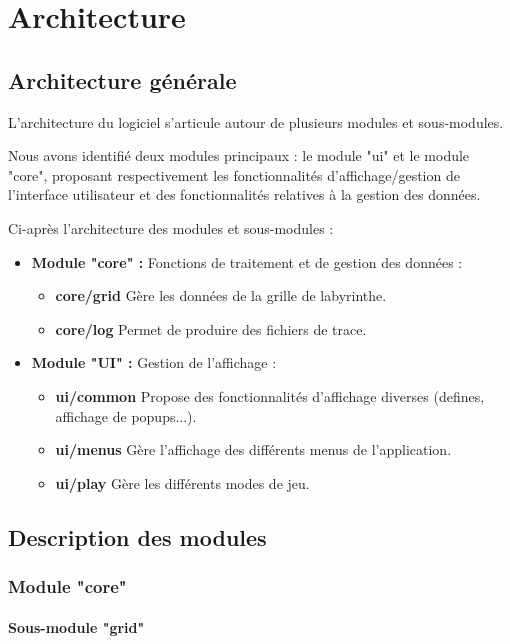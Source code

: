 \documentclass{book}
\begin{document}
\chapter{Architecture}

\section{Architecture générale}

L'architecture du logiciel s'articule autour de plusieurs modules et sous-modules.

Nous avons identifié deux modules principaux : le module "ui" et le module "core", proposant respectivement les fonctionnalités d'affichage/gestion de l'interface utilisateur et des fonctionnalités relatives à la gestion des données.

Ci-après l'architecture des modules et sous-modules :
\begin{itemize}
	\item	\textbf{Module "core" :} Fonctions de traitement et de gestion des données :
	\begin{itemize}
		\item \textbf{core/grid} Gère les données de la grille de labyrinthe.
		\item \textbf{core/log} Permet de produire des fichiers de trace.
	\end{itemize}
	\item	\textbf{Module "UI" :} Gestion de l'affichage :
	\begin{itemize}
		\item \textbf{ui/common} Propose des fonctionnalités d'affichage diverses (defines, affichage de popups...).
		\item \textbf{ui/menus} Gère l'affichage des différents menus de l'application.
		\item \textbf{ui/play} Gère les différents modes de jeu.
	\end{itemize}
\end{itemize}

\section{Description des modules}
\subsection{Module "core"}
\subsubsection{Sous-module "grid"}
\end{document}
